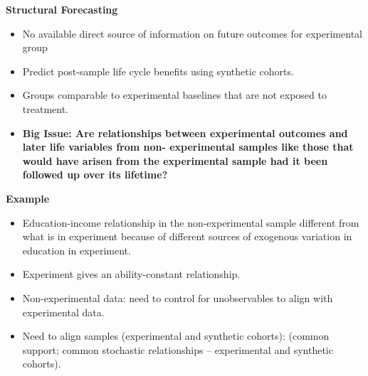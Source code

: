 \documentclass[static]{JJH-Beamer}
\begin{document}
\begin{frame}

\begin{center}
\textbf{Structural Forecasting}
\end{center}

\begin{itemize}
\item No available direct source of information on future outcomes for experimental group
\item Predict post-sample life cycle benefits using synthetic cohorts.
\item Groups comparable to experimental baselines that are not exposed to treatment.
\item \textbf{Big Issue: Are relationships between experimental outcomes and later life variables from non- experimental samples like those that would have arisen from the experimental sample had it been followed up over its lifetime?}
\end{itemize}

\end{frame}

\begin{frame}

\begin{center}
\textbf{Example}
\end{center}

\begin{itemize}
\item Education-income relationship in the non-experimental sample different from what is in experiment because of different sources of exogenous variation in education in experiment.
\item Experiment gives an ability-constant relationship.
\item Non-experimental data: need to control for unobservables to align with experimental data.
\item Need to align samples (experimental and synthetic cohorts): (common support; common stochastic relationships -- experimental and synthetic cohorts).
\end{itemize}

\end{frame}
\end{document}
